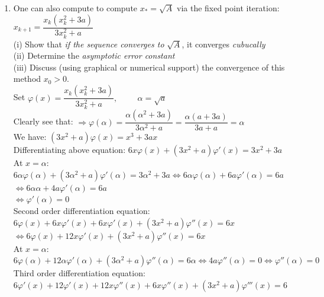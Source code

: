 \documentclass[14pt,a4paper]{article}
\begin{document}
\begin{enumerate}
	
	\label{3d}
	\item One can also compute to compute $x_* = \sqrt{A}$ via the fixed point iteration:\\
	\hspace*{5cm} $x_{k+1} =  \dfrac{x_k(x_k^2 + 3a)}{3x_k^2 + a}$\\
	(i) Show that \textit{if the sequence converges to} $\sqrt{A}$, it converges \textit{cubucally}\\
	(ii) Determine the \textit{asymptotic error constant} \\
	(iii) Discuss (using graphical or numerical support) the convergence of this method $x_0 > 0$.\\
	Set $\varphi(x) = \dfrac{x_k(x_k^2 + 3a)}{3x_k^2 + a}, \hspace{1cm} \alpha = \sqrt{a}$\\
	Clearly see that: $\Rightarrow \varphi(\alpha) = \dfrac{\alpha(\alpha^2 + 3a)}{3\alpha^2 + a} = \dfrac{\alpha(a+3a)}{3a +a} =\alpha$\\
	We have: $(3x^2 + a)\varphi(x) = x^3 + 3ax$\\
	Differentiating above equation: $6x\varphi(x) + (3x^2 + a)\varphi'(x) = 3x^2 + 3a$ \\
	At $x = \alpha$:  $6\alpha\varphi(\alpha) + (3\alpha^2 + a)\varphi'(\alpha) = 3\alpha^2 + 3a \Leftrightarrow 6\alpha\varphi(\alpha) + 6a\varphi'(\alpha) = 6a $ \\
	\hspace*{8.6cm} $ \Leftrightarrow 6\alpha\alpha + 4a\varphi'(\alpha) = 6a $ \\
	\hspace*{8.6cm} $ \Leftrightarrow \varphi'(\alpha) = 0 $ \\
	Second order differentiation equation: $6\varphi(x) + 6x\varphi'(x) + 6x\varphi'(x) + (3x^2 + a)\varphi''(x) = 6x$ \\
	\hspace*{6.3cm} $\Leftrightarrow 6\varphi(x) + 12x\varphi'(x) + (3x^2 + a)\varphi''(x) = 6x$ \\
	At $x = \alpha$: $6\varphi(\alpha) + 12\alpha\varphi'(\alpha) + (3\alpha^2 + a)\varphi''(\alpha) = 6\alpha \Leftrightarrow 4a\varphi''(\alpha) = 0 \Leftrightarrow \varphi''(\alpha) = 0 $ \\
	Third order differentiation equation:\\
	\hspace*{2.6cm} $6\varphi'(x) + 12\varphi'(x) + 12x\varphi''(x) + 6x\varphi''(x) + (3x^2 + a)\varphi'''(x) = 6$ \\

\end{enumerate}
\end{document}
